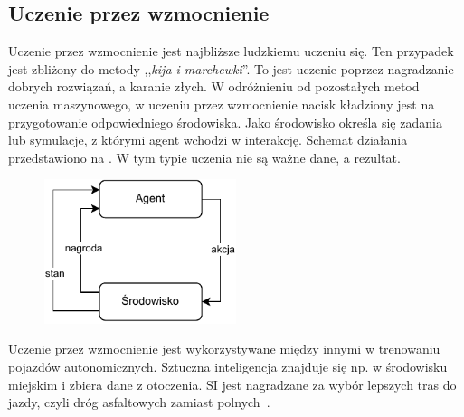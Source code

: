 \subsection{Uczenie przez wzmocnienie}
Uczenie przez wzmocnienie jest najbliższe ludzkiemu uczeniu się. Ten przypadek jest zbliżony do metody ,,\textit{kija i marchewki}''. To jest uczenie poprzez nagradzanie dobrych rozwiązań, a karanie złych. W odróżnieniu od pozostałych metod uczenia maszynowego, w uczeniu przez wzmocnienie nacisk kładziony jest na przygotowanie odpowiedniego środowiska. Jako środowisko określa się zadania lub symulacje, z którymi agent wchodzi w interakcję. Schemat działania przedstawiono na . W tym typie uczenia nie są ważne dane, a rezultat.

\begin{figure}[H]
    \centering
    \includegraphics[width=0.5\textwidth]{images/reinforcemen}
    \label{fig:reinforcemenet}
\end{figure}

Uczenie przez wzmocnienie jest wykorzystywane między innymi w trenowaniu pojazdów autonomicznych. Sztuczna inteligencja znajduje się np. w środowisku miejskim i zbiera dane z otoczenia. SI jest nagradzane za wybór lepszych tras do jazdy, czyli dróg asfaltowych zamiast polnych~\cite{AiScience, Mahesh2018}.


